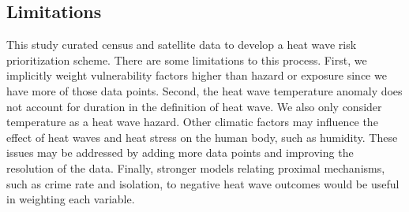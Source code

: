 \subsection{Limitations}

This study curated census and satellite data to develop a heat wave risk prioritization
scheme. There are some limitations to this process. First, we implicitly weight
vulnerability factors higher than hazard or exposure since we have more of those
data points. Second, the heat wave temperature anomaly does not account for duration
in the definition of heat wave. We also only consider temperature as a heat wave
hazard. Other climatic factors may influence the effect of heat waves and heat
stress on the human body, such as humidity. These issues may be addressed by
adding more data points and improving the resolution of the data. Finally, stronger
models relating proximal mechanisms, such as crime rate and isolation, to negative
heat wave outcomes would be useful in weighting each variable.
